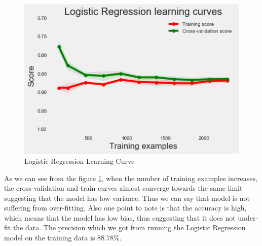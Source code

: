 \begin{figure}[H]
\caption{Logistic Regression Learning Curve}
\label{5.1}
\centering
\includegraphics[width=\columnwidth]{images/5_1.png}
\end{figure}

As we can see from the figure \ref{5.1}, when the number of training examples increases, the cross-validation and train curves almost converge towards the same limit suggesting that the model has low variance. Thus we can say that model is not suffering from over-fitting. Also one point to note is that the accuracy is high, which means that the model has low bias, thus suggesting that it does not under-fit the data. The precision which we got from running the Logistic Regression model on the training data is 88.78\%.

